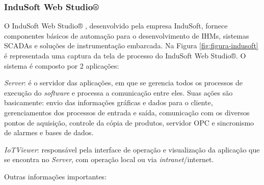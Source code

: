         \begin{figure}[!h]
    \end{figure}
\subsubsection{InduSoft Web Studio®}
\label{sec:indusoft}

    O InduSoft Web Studio® \cite{InduSoft}, desenvolvido pela empresa InduSoft, fornece componentes básicos de automação para o desenvolvimento de \glspl{IHM}, sistemas \glspl{SCADA} e soluções de instrumentação embarcada. Na Figura \ref{fig:figura-indusoft} é representada uma captura da tela de processo do InduSoft Web Studio®. O sistema é composto por 2 aplicações:
    
    \begin{alineascomponto}
        \item \textit{Server}: é o servidor das aplicações, em que se gerencia todos os processos de execução do \textit{software} e processa a comunicação entre eles. Suas ações são basicamente: envio das informações gráficas e dados para o cliente, gerenciamentos dos processos de entrada e saída,  comunicação com os diversos pontos de aquisição, controle da cópia de produtos, servidor OPC e sincronismo de alarmes e bases de dados.
    	\item \textit{IoTViewer}: responsável pela interface de operação e visualização da aplicação que se encontra no \textit{Server}, com operação local ou via \textit{intranet}/internet.
    \end{alineascomponto}
\newpage
    Outras informações importantes:
    
